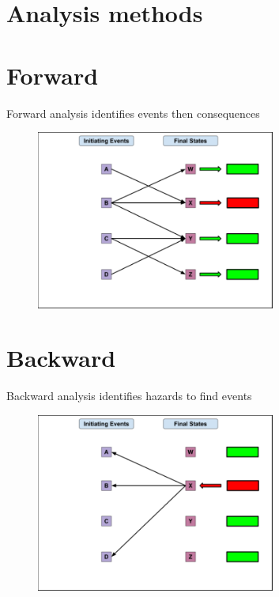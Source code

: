 \documentclass[aspectratio=1610,pdftex,dvipsnames,compress,xcolor={dvipsnames}]{beamer}
\begin{document}
\section{Analysis methods}

    
\section{Forward}


\addtocounter{framenumber}{-2}
\begin{frame}{Forward analysis identifies events then consequences}
    \begin{figure}
        \centering
        \includegraphics[width=0.70\textwidth]{forward.jpg}
    \end{figure}
\end{frame}


\section{Backward}


\addtocounter{framenumber}{-1}
\begin{frame}{Backward analysis identifies hazards to find events}
    \begin{figure}
        \centering
        \includegraphics[width=0.70\textwidth]{backward.jpg}
    \end{figure}
\end{frame}
\end{document}
